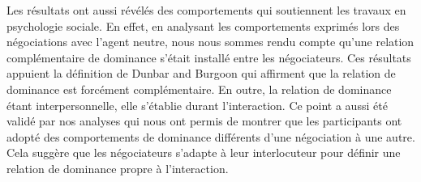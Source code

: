 	Les résultats ont aussi révélés des comportements qui soutiennent les travaux en psychologie sociale. En effet, en analysant les comportements exprimés lors des négociations avec l'agent neutre, nous nous sommes rendu compte qu'une relation complémentaire de dominance s'était installé entre les négociateurs. Ces résultats appuient la définition de Dunbar and Burgoon \cite{dunbar2005perceptions} qui affirment que la relation de dominance est forcément complémentaire. En outre, la relation de dominance étant interpersonnelle, elle s'établie durant l'interaction. Ce point a aussi été validé par nos analyses qui nous ont permis de montrer que les participants ont adopté des comportements de dominance différents d'une négociation à une autre. Cela suggère que les négociateurs s'adapte à leur interlocuteur pour définir une relation de dominance propre à l'interaction. 